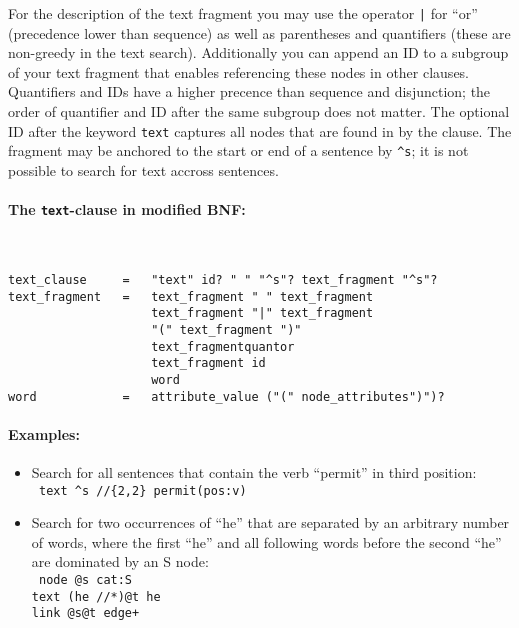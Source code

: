 \documentclass[12pt]{scrartcl}
\begin{document}
For the description of the text fragment you may use the operator \texttt{|} for “or” (precedence lower than sequence) as well as parentheses and quantifiers (these are non-greedy in the text search).
Additionally you can append an ID to a subgroup of your text fragment that enables referencing these nodes in other clauses.
Quantifiers and IDs have a higher precence than sequence and disjunction; the order of quantifier and ID after the same subgroup does not matter.
The optional ID after the keyword \texttt{text} captures all nodes that are found in by the clause.
The fragment may be anchored to the start or end of a sentence by \texttt{\^{}s}; it is not possible to search for text accross sentences.

\paragraph*{The \texttt{text}-clause in modified BNF:}
~
\begin{framed}
\begin{lstlisting}
text_clause     =   "text" id? " " "^s"? text_fragment "^s"?
text_fragment   =   text_fragment " " text_fragment
                    text_fragment "|" text_fragment
                    "(" text_fragment ")"
                    text_fragmentquantor
                    text_fragment id
                    word
word            =   attribute_value ("(" node_attributes")")?
\end{lstlisting}
\end{framed}

\paragraph*{Examples:}
\begin{itemize}
	\item Search for all sentences that contain the verb “permit” in third position:\\
	{\tt
	text \^{}s //\{2,2\} permit(pos:v)
	}
	\item Search for two occurrences of “he” that are separated by an arbitrary number of words, where the first “he” and all following words before the second “he” are dominated by an S node:\\
	{\tt
	node @s cat:S\\
	text (he //*)@t he\\
	link @s@t edge+
	}
\end{itemize}
\end{document}
